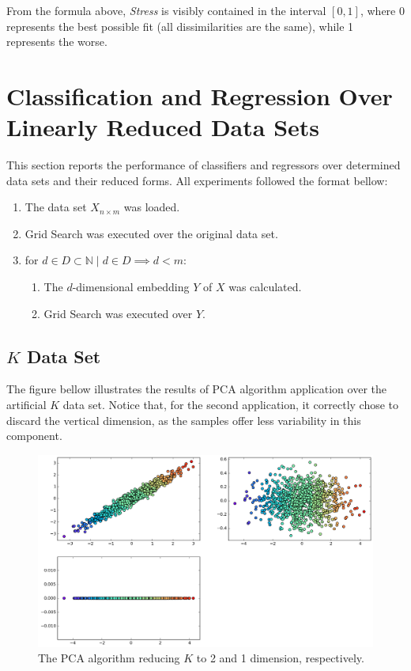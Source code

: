 \documentclass[12pt]{report}
\begin{document}
From the formula above, {\em Stress} is visibly contained in the interval $[0, 1]$, where 0 represents the best possible fit (all dissimilarities are the same), while 1 represents the worse.

\section{Classification and Regression Over Linearly Reduced Data Sets}
\label{sec:experiments_linear_ds}

This section reports the performance of classifiers and regressors over determined data sets and their reduced forms. All experiments followed the format bellow:

\begin{enumerate}
	\item The data set $X_{n \times m}$ was loaded.
	\item Grid Search was executed over the original data set.
	\item for $d \in D \subset \mathbb{N} \mid d \in D \implies d < m$:
	\begin{enumerate}
		\item The $d$-dimensional embedding $Y$ of $X$ was calculated.
		\item Grid Search was executed over $Y$.
	\end{enumerate}
\end{enumerate}

\subsection{$K$ Data Set}

The figure bellow illustrates the results of PCA algorithm application over the artificial $K$ data set. Notice that, for the second application, it correctly chose to discard the vertical dimension, as the samples offer less variability in this component.

\begin{figure}[H]
	\centering
	\captionsetup{justification=centering}

	\includegraphics[width=.9\linewidth]{experiments/pca_r}
	\caption{The PCA algorithm reducing $K$ to 2 and 1 dimension, respectively.}
	\label{fig:datasetrpca}
\end{figure}
\end{document}
